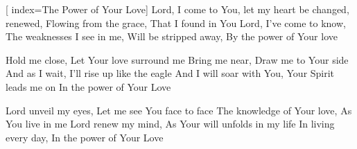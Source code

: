 [
index={The Power of Your Love}]
\beginverse	
Lord, I come to You, let my heart be changed, renewed,
Flowing from the grace, That I found in You
Lord, I've come to know,
 The weaknesses I see in me,
Will be stripped away, By the power of Your love
\endverse

\beginchorus
Hold me close, Let Your love surround me
Bring me near, Draw me to Your side
And as I wait, I'll rise up like the eagle
And I will soar with You, Your Spirit leads me on
In the power of Your Love
\endchorus

\beginverse
\chordsoff
Lord unveil my eyes,
 Let me see You face to face
The knowledge of Your love, As You live in me
Lord renew my mind,
 As Your will unfolds in my life
In living every day, In the power of Your Love 
\chordson
\endverse


\endsong